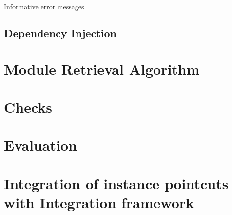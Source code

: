 Informative error messages
\subsection{Dependency Injection}\label{sec:zamk:di}

\section{Module Retrieval Algorithm}
\section{Checks}
\section{Evaluation}
\section{Integration of instance pointcuts with Integration framework}
